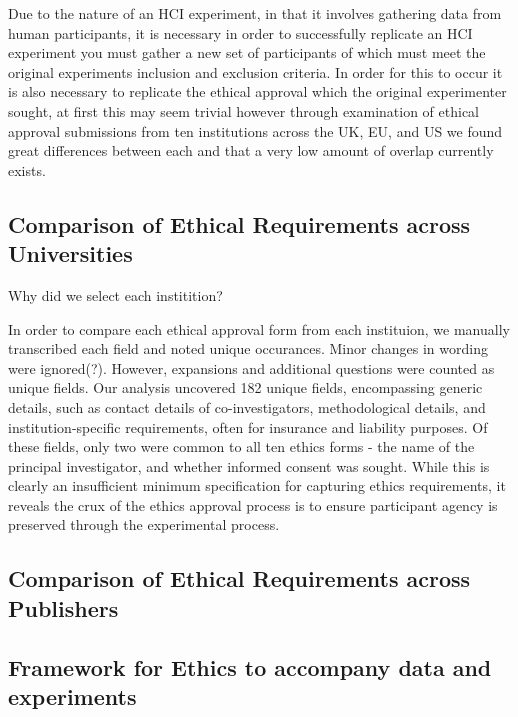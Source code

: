 Due to the nature of an HCI experiment, in that it involves gathering data from human participants, it is necessary in order to successfully replicate an HCI experiment you must gather a new set of participants of which must meet the original experiments inclusion and exclusion criteria. In order for this to occur it is also necessary to replicate the ethical approval which the original experimenter sought, at first this may seem trivial however through examination of ethical approval submissions from ten institutions across the UK, EU, and US we found great differences between each and that a very low amount of overlap currently exists.

\subsection{Comparison of Ethical Requirements across Universities}


Why did we select each institition?



In order to compare each ethical approval form from each instituion, we manually transcribed each field and noted unique occurances. Minor changes in wording were ignored(?). However, expansions and additional questions were counted as unique fields. Our analysis uncovered 182 unique fields, encompassing generic details, such as contact details of co-investigators, methodological details, and institution-specific requirements, often for insurance and liability purposes. Of these fields, only two were common to all ten ethics forms - the name of the principal investigator, and whether informed consent was sought. While this is clearly an insufficient  minimum specification for capturing ethics requirements, it reveals the crux of the ethics approval process is to ensure participant agency is preserved through the experimental process.










\subsection{Comparison of Ethical Requirements across Publishers}

\subsection{Framework for Ethics to accompany data and experiments}

